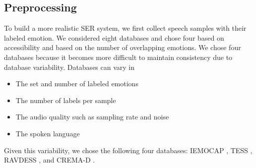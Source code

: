 \documentclass[a4paper, 10pt, conference]{ieeeconf}      %
\begin{document}
\subsection{Preprocessing} \label{Preprocessing}


To build a more realistic SER system, we first collect speech samples with their labeled emotion. We considered eight databases and chose four based on accessibility and based on the number of overlapping emotions. We chose four databases because it becomes more difficult to maintain consistency due to database variability. Databases can vary in
\begin{itemize}
	\item The set and number of labeled emotions
	\item The number of labels per sample
	\item The audio quality such as sampling rate and noise
	\item The spoken language
\end{itemize}
Given this variability, we chose the following four databases: IEMOCAP \cite{busso_2008}, TESS \cite{dupuis_2011}, RAVDESS \cite{livingstone_2018}, and CREMA-D \cite{cao_2014}.
\end{document}
